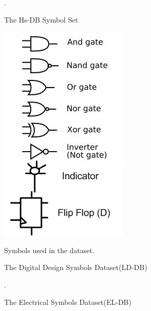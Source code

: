 \documentclass{article}
\begin{document}
\begin{figure}
\centering 
\label{fig:symbolSet}
		\caption{The Hs-DB Symbol Set}.
\end{figure}
\begin{figure}
\centering 
\label{fig:LogicsymbolSet}
 
		\includegraphics[scale=0.5]{images/logicSet.jpg}	 
		\caption{The Digital Design Symbols Dataset(LD-DB)} Symbols used in the dataset.
\end{figure}
\begin{figure}
\centering 
\label{fig:ELsymbolSet}
		\caption{The Electrical Symbols Dataset(EL-DB)} .
\end{figure}
\end{document}
